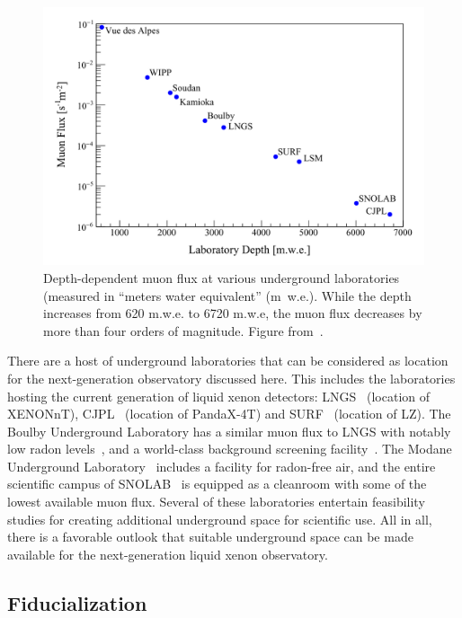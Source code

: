 \begin{figure}[!htbp]
\begin{center}
\includegraphics[width=0.99\columnwidth]{fig_muon_flux.png}
\caption{Depth-dependent muon flux at various underground laboratories (measured in “meters water equivalent” (m~w.e.). While the depth increases from 620 m.w.e. to 6720 m.w.e, the muon flux decreases by more than four orders of magnitude. Figure from~\cite{Schumann:2019eaa}.}\label{fig:muonflux}
\end{center}
\end{figure}
  
There are a host of underground laboratories that can be considered as location for the next-generation observatory discussed here. This includes the laboratories hosting the current generation of liquid xenon detectors: LNGS~\cite{Bettini:2007xc} (location of XENONnT), CJPL~\cite{Li:2014rca} (location of PandaX-4T) and SURF~\cite{Heise:2017rpu} (location of LZ). The Boulby Underground Laboratory has a similar muon flux to LNGS with notably low radon levels~\cite{Paling:2015ss}, and a world-class background screening facility~\cite{Scovell:2018ap}. The Modane Underground Laboratory~\cite{Piquemal:2012fs} includes a facility for radon-free air, and the entire scientific campus of SNOLAB~\cite{Lawson:2012sga} is equipped as a cleanroom with some of the lowest available muon flux. Several of these laboratories entertain feasibility studies for creating additional underground space for scientific use. All in all, there is a favorable outlook that suitable underground space can be made available for the next-generation liquid xenon observatory.

\subsection{Fiducialization}\label{sec:erfiducialization}


